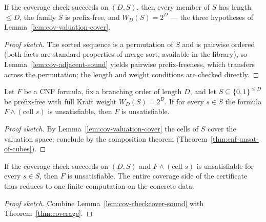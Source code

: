 \begin{lemma}\label{lem:cov-checkcover-sound}
If the coverage check succeeds on $(D, S)$, then every member of $S$ has
length $\le D$, the family $S$ is prefix-free, and $W_D(S) = 2^D$ --- the
three hypotheses of Lemma~\ref{lem:cov-valuation-cover}.
\leanok
{}
\end{lemma}
\begin{proof}[Proof sketch]
The sorted sequence is a permutation of $S$ and is pairwise ordered (both
facts are standard properties of merge sort, available in the library), so
Lemma~\ref{lem:cov-adjacent-sound} yields pairwise prefix-freeness, which
transfers across the permutation; the length and weight conditions are
checked directly.
\end{proof}

\begin{theorem}\label{thm:coverage}
Let $F$ be a CNF formula, fix a branching order of length $D$, and let
$S \subseteq \{0,1\}^{\le D}$ be prefix-free with full Kraft weight
$W_D(S) = 2^D$.  If for every $s \in S$ the formula
$F \wedge (\text{cell } s)$ is unsatisfiable, then $F$ is unsatisfiable.
\leanok
{}
\end{theorem}
\begin{proof}[Proof sketch]
By Lemma~\ref{lem:cov-valuation-cover} the cells of $S$ cover the valuation
space; conclude by the composition theorem
(Theorem~\ref{thm:cnf-unsat-of-cubes}).
\end{proof}

\begin{corollary}\label{cor:cov-checked}
If the coverage check succeeds on $(D, S)$ and $F \wedge (\text{cell } s)$
is unsatisfiable for every $s \in S$, then $F$ is unsatisfiable.  The
entire coverage side of the certificate thus reduces to one finite
computation on the concrete data.
\leanok
{}
\end{corollary}
\begin{proof}[Proof sketch]
Combine Lemma~\ref{lem:cov-checkcover-sound} with
Theorem~\ref{thm:coverage}.
\end{proof}

